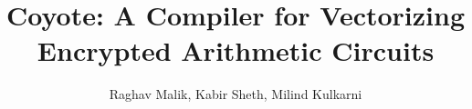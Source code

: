 \documentclass[pageno]{jpaper}
\title{Coyote: A Compiler for Vectorizing Encrypted Arithmetic Circuits}
\author{Raghav Malik, Kabir Sheth, Milind Kulkarni}
\begin{document}
\maketitle









\pagebreak
\clearpage
% 


\end{document}
